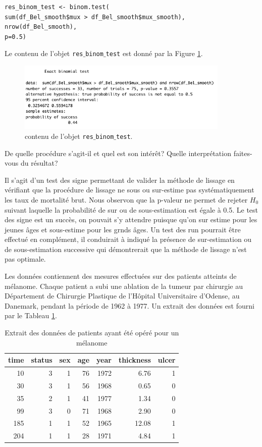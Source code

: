 \documentclass[11pt, addpoints, answers]{exam}
\begin{document}
\begin{questions}
\begin{parts}
\begin{lstlisting}
res_binom_test <- binom.test(
sum(df_Bel_smooth$mux > df_Bel_smooth$mux_smooth), 
nrow(df_Bel_smooth), 
p=0.5)
\end{lstlisting}
Le contenu de l'objet \texttt{res$\_$binom$\_$test} est donné par la Figure \ref{fig:binom_test_screen_shot}.
\begin{figure}[!ht]
\centering
\includegraphics[width = 0.9\textwidth]{figures/binom_test_screen_shot.png}
\caption{contenu de l'objet \texttt{res$\_$binom$\_$test}.}
\label{fig:binom_test_screen_shot}
\end{figure}

De quelle procédure s'agit-il et quel est son intérêt? Quelle interprétation faites-vous du résultat?
\begin{solution}
Il s'agit d'un test des signe permettant de valider la méthode de lissage en vérifiant que la procédure de lissage ne sous ou sur-estime pas systématiquement les taux de mortalité brut. Nous observon que la p-valeur ne permet de rejeter $H_0$ suivant laquelle la probabilité de sur ou de sous-estimation est égale à 0.5. Le test des signe est un succès, on pouvait s'y attendre puisque qu'on sur estime pour les jeunes âges et sous-estime pour les grnds âges. Un test des run pourrait être effectué en complément, il conduirait à indiqué la présence de sur-estimation ou de sous-estimation successive qui démontrerait que la méthode de lissage n'est pas optimale. 
\end{solution}
\end{parts}
\question Les données contiennent des mesures effectuées sur des patients atteints de mélanome. Chaque patient a subi une ablation de la tumeur par chirurgie au Département de Chirurgie Plastique de l’Hôpital Universitaire d’Odense, au Danemark, pendant la période de 1962 à 1977. Un extrait des données est fourni par le Tableau \ref{tab:extrait_melanome}.
\begin{table}[!ht]
\centering
\begin{tabular}{rrrrrrr}
  \hline
time & status & sex & age & year & thickness & ulcer \\ 
  \hline
10 & 3 & 1 & 76 & 1972 & 6.76 & 1 \\ 
  30 & 3 & 1 & 56 & 1968 & 0.65 & 0 \\ 
  35 & 2 & 1 & 41 & 1977 & 1.34 & 0 \\ 
  99 & 3 & 0 & 71 & 1968 & 2.90 & 0 \\ 
  185 & 1 & 1 & 52 & 1965 & 12.08 & 1 \\ 
  204 & 1 & 1 & 28 & 1971 & 4.84 & 1 \\ 
   \hline
\end{tabular}
\caption{Extrait des données de patients ayant été opéré pour un mélanome}
\label{tab:extrait_melanome}
\end{table}


\end{questions}
\end{document}
